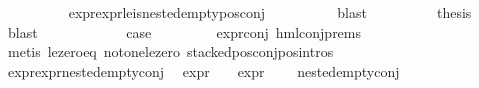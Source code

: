 \begin{isabellebody}
\ \ \ \ \ \ \ \ \isamarkupfalse%
\ expr{\isacharunderscore}{\kern0pt}{}{\isacharunderscore}{\kern0pt}expr{\isacharunderscore}{\kern0pt}{}{\isacharunderscore}{\kern0pt}le{\isacharunderscore}{\kern0pt}{}{\isacharunderscore}{\kern0pt}is{\isacharunderscore}{\kern0pt}nested{\isacharunderscore}{\kern0pt}empty{\isacharunderscore}{\kern0pt}pos{\isacharunderscore}{\kern0pt}conj\isanewline
\ \ \ \ \ \ \ \ \isamarkupfalse%
\ blast\isanewline
\ \ \ \ \ \ \isamarkupfalse%
\ \isamarkupfalse%
\ {\isacharquery}{\kern0pt}thesis\ \isamarkupfalse%
\ blast\isanewline
\ \ \ \ \isamarkupfalse%
\isanewline
\ \ \ \ \isamarkupfalse%
\ \isamarkupfalse%
\ {\isacharquery}{\kern0pt}case\ \isanewline
\ \ \ \ \ \ \isamarkupfalse%
\ expr{\isacharunderscore}{\kern0pt}{}{\isacharunderscore}{\kern0pt}conj\ hml{\isacharunderscore}{\kern0pt}conj{\isachardot}{\kern0pt}prems{\isacharparenleft}{\kern0pt}{}{\isacharparenright}{\kern0pt}\isanewline
\ \ \ \ \ \ \isamarkupfalse%
\ {\isacharparenleft}{\kern0pt}metis\ le{\isacharunderscore}{\kern0pt}zero{\isacharunderscore}{\kern0pt}eq\ not{\isacharunderscore}{\kern0pt}one{\isacharunderscore}{\kern0pt}le{\isacharunderscore}{\kern0pt}zero\ stacked{\isacharunderscore}{\kern0pt}pos{\isacharunderscore}{\kern0pt}conj{\isacharunderscore}{\kern0pt}pos{\isachardot}{\kern0pt}intros{\isacharparenleft}{\kern0pt}{}{\isacharparenright}{\kern0pt}{\isacharparenright}{\kern0pt}\isanewline
\ \ \isamarkupfalse%
\isanewline
{}\isamarkupfalse%
%
\endisatagproof
{\isafoldproof}%
%
\isadelimproof
\isanewline
%
\endisadelimproof
\isanewline
{}\isamarkupfalse%
\ expr{\isacharunderscore}{\kern0pt}{}{\isacharunderscore}{\kern0pt}{}{\isacharunderscore}{\kern0pt}expr{\isacharunderscore}{\kern0pt}{}{\isacharunderscore}{\kern0pt}{}{\isacharunderscore}{\kern0pt}nested{\isacharunderscore}{\kern0pt}empty{\isacharunderscore}{\kern0pt}conj{\isacharcolon}{\kern0pt}\ \isanewline
{}\ {\isachardoublequoteopen}expr{\isacharunderscore}{\kern0pt}{}\ {\isasymphi}\ {\isasymle}\ {}{\isachardoublequoteclose}\ {\isachardoublequoteopen}expr{\isacharunderscore}{\kern0pt}{}\ {\isasymphi}\ {\isasymle}\ {}{\isachardoublequoteclose}\isanewline
{}\ {\isachardoublequoteopen}nested{\isacharunderscore}{\kern0pt}empty{\isacharunderscore}{\kern0pt}conj\ {\isasymphi}{\isachardoublequoteclose}\isanewline

\end{isabellebody}
